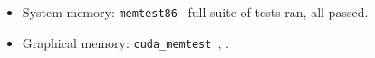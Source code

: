 \documentclass[letterpaper, 10 pt, journal, twoside]{IEEEtran}
\begin{document}
\begin{itemize}[leftmargin=*]
    \item System memory: \texttt{memtest86}~\cite{MemTest86} full suite of tests ran, all passed.
    \item Graphical memory: \texttt{cuda\_memtest}~\cite{cuda_memtest}, \cite{shi2009testing}.
\end{itemize}









\end{document}
